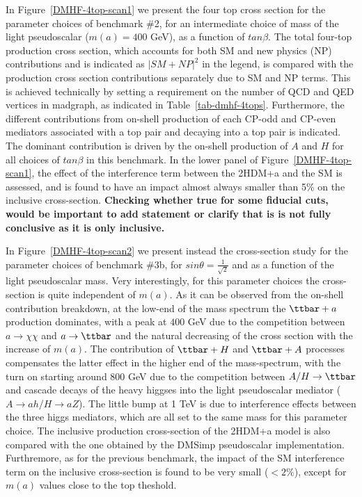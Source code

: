In Figure~\ref{DMHF-4top-scan1} we present the four top cross section
for the parameter choices of benchmark \#2, for an intermediate choice
of mass of the light pseudoscalar ($m(a) = 400$ GeV), as a function of
$tan\beta$. The total four-top production cross section, which
accounts for both SM and new physics (NP) contributions and is indicated
as $|SM+NP|^2$ in the legend, is compared with the production cross
section contributions separately due to SM and NP terms. 
This is achieved technically by setting a requirement on the number of
QCD and QED vertices in madgraph, as indicated in Table~\ref{tab-dmhf-4tops}.
Furthermore, the different contributions from on-shell production of
each CP-odd and CP-even mediators associated with a top pair and
decaying into a top pair is indicated. The dominant contribution is
driven by the on-shell production of $A$ and $H$ for all choices of
$tan\beta$ in this benchmark. 
In the lower panel of Figure~\ref{DMHF-4top-scan1}, the effect of the
interference term between the 2HDM+a and the SM is assessed, and is
found to have an impact almost always smaller than 5\% on the
inclusive cross-section. \textbf{Checking whether true for some
fiducial cuts, would be important to add statement or clarify that is
is not fully conclusive as it is only inclusive.}

In Figure~\ref{DMHF-4top-scan2} we present instead the cross-section
study for the parameter choices of benchmark \#3b, for $sin\theta
= \frac{1}{\sqrt{2}}$ and as a function of the light pseudoscalar mass. 
Very interestingly, for this parameter choices the cross-section is
quite independent of $m(a)$. As it can
be observed from the on-shell contribution breakdown, at the
low-end of the mass spectrum the $\ttbar+a$ production dominates, with a
peak at $400$ GeV due to the competition between
$a\rightarrow \chi\chi$ and $a\rightarrow \ttbar$ and the natural
decreasing of the cross section with the increase of $m(a)$.  The contribution of
$\ttbar+H$ and $\ttbar+A$ processes compensates the latter effect in
the higher end of the mass-spectrum, with the turn on starting around
$800$ GeV due to the competition between $A/H\rightarrow\ttbar$ and
cascade decays of the heavy higgses into the light pseudoscalar
mediator ($A\rightarrow ah/H\rightarrow aZ$). 
The little bump at 1 TeV is due to interference effects between the
three higgs mediators, which are all set to the
same mass for this parameter choice.  
The inclusive production cross-section of the 2HDM+a
model is also compared with the one obtained by the DMSimp pseudoscalar
implementation. Furthremore, as for the previous benchmark,  the impact of the SM interference
term on the inclusive cross-section is found to be very small
($<2\%$), except for $m(a)$ values close to the top theshold. 


